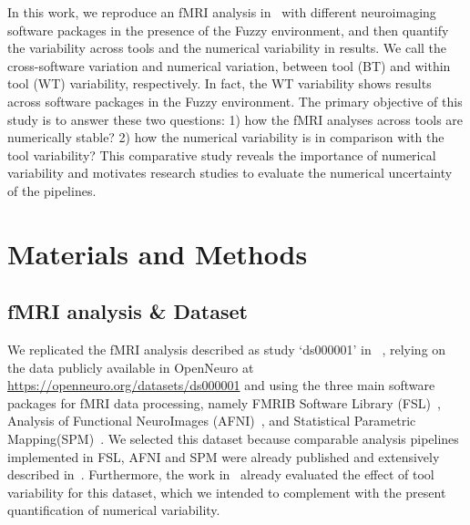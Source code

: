 \documentclass[conference]{IEEEtran}
\begin{document}
In this work, we reproduce an fMRI analysis in~\cite{bowring2019exploring} with different neuroimaging software packages in the presence of the Fuzzy environment,
and then quantify the variability across tools and the numerical variability in results.
We call the cross-software variation and numerical variation, between tool (BT) and within tool (WT) variability, respectively.
In fact, the WT variability shows results across software packages in the Fuzzy environment.
The primary objective of this study is to answer these two questions: 1) how the fMRI analyses across tools are numerically stable?
2) how the numerical variability is in comparison with the tool variability?
This comparative study reveals the importance of numerical variability and motivates research studies to evaluate the numerical uncertainty of the pipelines.



\section{Materials and Methods}

\subsection{fMRI analysis \& Dataset}

We replicated the fMRI analysis described as study `ds000001'
in~\cite{bowring2019exploring} , relying on the
data publicly available in OpenNeuro at
\url{https://openneuro.org/datasets/ds000001} and using the three main
software packages for fMRI data processing, namely FMRIB Software Library
(FSL)~\cite{jenkinson2012fsl}, Analysis of Functional NeuroImages
(AFNI)~\cite{cox1996afni}, and Statistical Parametric
Mapping(SPM)~\cite{penny2011statistical}. We selected this dataset because
comparable analysis pipelines implemented in FSL, AFNI and SPM 
were already published and extensively described in~\cite{bowring2019exploring}.
Furthermore, the work in~\cite{bowring2019exploring} already evaluated the effect of tool variability for
this dataset, which we intended to complement with the present quantification of numerical variability.
\end{document}
